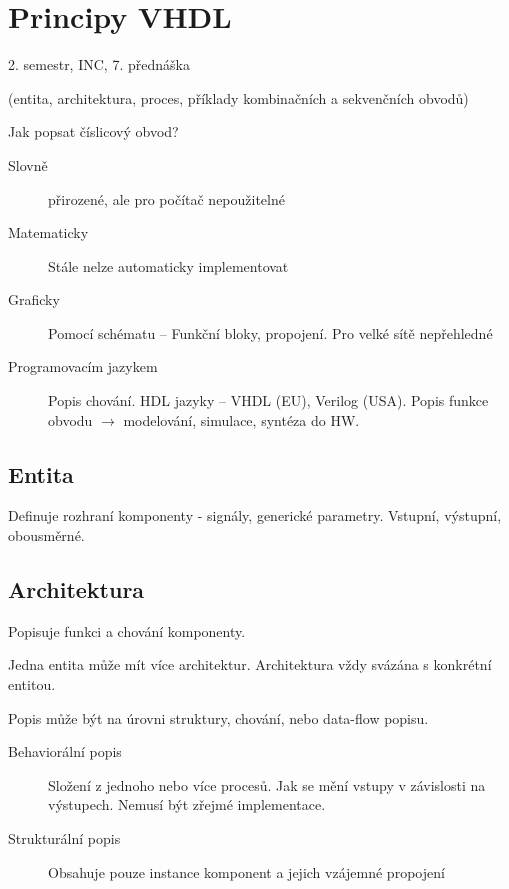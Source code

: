 \documentclass[a4paper, 11pt]{report}
\begin{document}
\setcounter{chapter}{9}
\chapter{Principy VHDL} \label{cha:10}

2. semestr, INC, 7. přednáška

(entita, architektura, proces, příklady kombinačních a sekvenčních obvodů)

Jak popsat číslicový obvod?
\begin{description}
	\item[Slovně] přirozené, ale pro počítač nepoužitelné
	\item[Matematicky] Stále nelze automaticky implementovat
	\item[Graficky] Pomocí schématu -- Funkční bloky, propojení. Pro velké sítě nepřehledné
	\item[Programovacím jazykem] Popis chování. HDL jazyky -- VHDL (EU), Verilog (USA). Popis funkce obvodu $\to$ modelování, simulace, syntéza do HW.
\end{description}

\section{Entita}

Definuje rozhraní komponenty - signály, generické parametry. Vstupní, výstupní, obousměrné.

\section{Architektura}

Popisuje funkci a chování komponenty.

Jedna entita může mít více architektur. Architektura vždy svázána s konkrétní entitou.

Popis může být na úrovni struktury, chování, nebo data-flow popisu.

\begin{description}
	\item[Behaviorální popis] Složení z jednoho nebo více procesů. Jak se mění vstupy v závislosti na výstupech. Nemusí být zřejmé implementace.
	\item[Strukturální popis] Obsahuje pouze instance komponent a jejich vzájemné propojení
\end{description}
\end{document}
